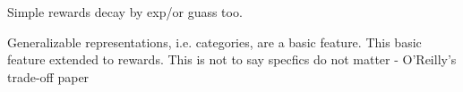 


Simple rewards decay by exp/or guass too.  

Generalizable representations, i.e. categories, are a basic feature.  This basic feature extended to rewards.  This is not to say specfics do not matter - O'Reilly's trade-off paper
